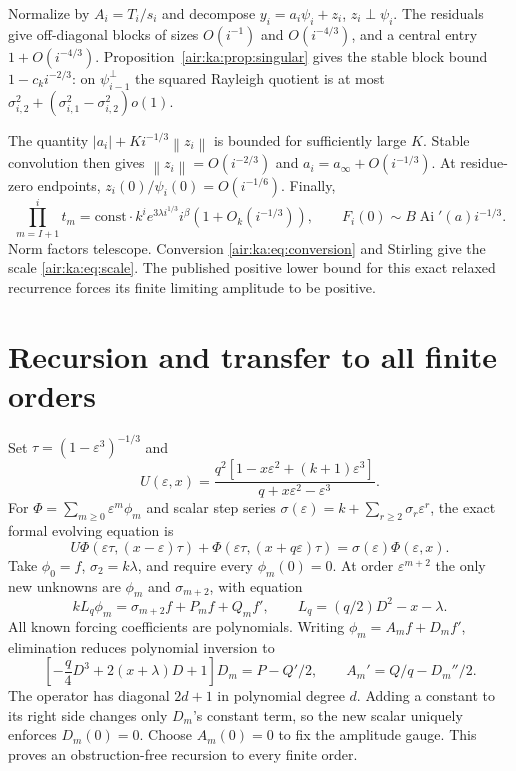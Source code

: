 \documentclass[11pt,letterpaper]{article}
\numberwithin{equation}{section}
\theoremstyle{remark}
\newcommand{\Ai}{\operatorname{Ai}}
\newcommand{\norm}[1]{\left\lVert#1\right\rVert}
\newcommand{\eps}{\varepsilon}
\begin{document}
Normalize by $A_i=T_i/s_i$ and decompose $y_i=a_i\psi_i+z_i$, $z_i\perp\psi_i$. The residuals give off-diagonal blocks of sizes $O(i^{-1})$ and $O(i^{-4/3})$, and a central entry $1+O(i^{-4/3})$. Proposition~\ref{air:ka:prop:singular} gives the stable block bound $1-c_ki^{-2/3}$: on $\psi_{i-1}^\perp$ the squared Rayleigh quotient is at most $\sigma_{i,2}^2+(\sigma_{i,1}^2-\sigma_{i,2}^2)o(1)$.

The quantity $|a_i|+Ki^{-1/3}\norm{z_i}$ is bounded for sufficiently large $K$. Stable convolution then gives $\norm{z_i}=O(i^{-2/3})$ and $a_i=a_\infty+O(i^{-1/3})$. At residue-zero endpoints, $z_i(0)/\psi_i(0)=O(i^{-1/6})$. Finally,
\[
 \prod_{m=I+1}^it_m=\mathrm{const}\cdot k^i
 e^{3\lambda i^{1/3}}i^\beta(1+O_k(i^{-1/3})),
 \qquad F_i(0)\sim B\Ai'(a)i^{-1/3}.
\]
Norm factors telescope. Conversion \eqref{air:ka:eq:conversion} and Stirling give the scale \eqref{air:ka:eq:scale}. The published positive lower bound for this exact relaxed recurrence forces its finite limiting amplitude to be positive.

\section{Recursion and transfer to all finite orders}
Set $\tau=(1-\eps^3)^{-1/3}$ and
\[
 U(\eps,x)=\frac{q^2[1-x\eps^2+(k+1)\eps^3]}
 {q+x\eps^2-\eps^3}.
\]
For $\Phi=\sum_{m\ge0}\eps^m\phi_m$ and scalar step series
$\sigma(\eps)=k+\sum_{r\ge2}\sigma_r\eps^r$, the exact formal evolving equation is
\begin{equation}\label{air:ka:eq:formal}
 U\Phi(\eps\tau,(x-\eps)\tau)
 +\Phi(\eps\tau,(x+q\eps)\tau)=\sigma(\eps)\Phi(\eps,x).
\end{equation}
Take $\phi_0=f$, $\sigma_2=k\lambda$, and require every $\phi_m(0)=0$. At order $\eps^{m+2}$ the only new unknowns are $\phi_m$ and $\sigma_{m+2}$, with equation
\[
 kL_q\phi_m=\sigma_{m+2}f+P_mf+Q_mf',\qquad
 L_q=(q/2)D^2-x-\lambda.
\]
All known forcing coefficients are polynomials. Writing $\phi_m=A_mf+D_mf'$, elimination reduces polynomial inversion to
\begin{equation}\label{air:ka:eq:polyinv}
 \left[-\frac q4D^3+2(x+\lambda)D+1\right]D_m=P-Q'/2,
 \qquad A_m'=Q/q-D_m''/2.
\end{equation}
The operator has diagonal $2d+1$ in polynomial degree $d$. Adding a constant to its right side changes only $D_m$'s constant term, so the new scalar uniquely enforces $D_m(0)=0$. Choose $A_m(0)=0$ to fix the amplitude gauge. This proves an obstruction-free recursion to every finite order.
\end{document}
